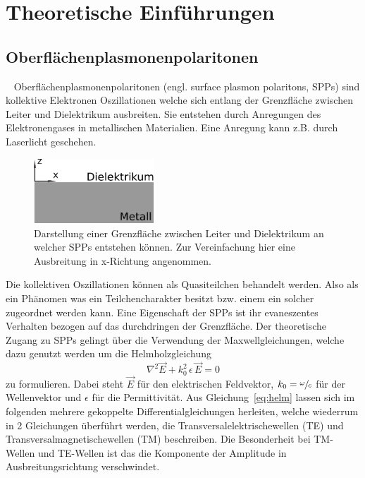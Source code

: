 \chapter{Theoretische Einführungen}

\section{Oberflächenplasmonenpolaritonen}~\label{sec:spps}
Oberflächenplasmonenpolaritonen (engl. surface plasmon polaritons, SPPs)
sind kollektive Elektronen Oszillationen welche sich entlang der Grenzfläche
zwischen Leiter und Dielektrikum ausbreiten.\cite{plasmonics}
Sie entstehen durch Anregungen des Elektronengases in metallischen Materialien.
Eine Anregung kann z.B. durch Laserlicht geschehen.

\begin{figure}
    \includegraphics[width=4.5cm]{./Plots/leiter_und_nichtleiter.pdf}
    \caption{Darstellung einer Grenzfläche zwischen Leiter und Dielektrikum an welcher 
    SPPs entstehen können. Zur Vereinfachung hier eine Ausbreitung in x-Richtung angenommen.\\}
    \label{fig:kasten}
\end{figure}
\FloatBarrier

Die kollektiven Oszillationen können als Quasiteilchen behandelt werden. 
Also als ein Phänomen was ein Teilchencharakter besitzt bzw. einem ein solcher zugeordnet werden kann. 
Eine Eigenschaft der SPPs ist ihr evaneszentes Verhalten bezogen auf das
durchdringen der Grenzfläche.
Der theoretische Zugang zu SPPs gelingt über die Verwendung der Maxwellgleichungen, welche dazu
genutzt werden um die Helmholzgleichung 
\begin{equation}
    \nabla^2 \vec{E} + k^2_0 \, \epsilon \, \vec{E} = 0
    \label{eq:helm}
\end{equation}
zu formulieren. 
Dabei steht $\vec{E}$ für den elektrischen Feldvektor, $k_0 = \sfrac{\omega}{c}$ 
für der Wellenvektor und $\epsilon$ für die Permittivität.
Aus Gleichung~\ref{eq:helm} lassen sich im folgenden mehrere gekoppelte Differentialgleichungen
herleiten, welche wiederrum in 2 Gleichungen überführt werden, die Transversalelektrischewellen (TE) und 
Transversalmagnetischewellen (TM) beschreiben.
Die Besonderheit bei TM-Wellen und TE-Wellen ist das 
die Komponente der Amplitude in Ausbreitungsrichtung verschwindet.

